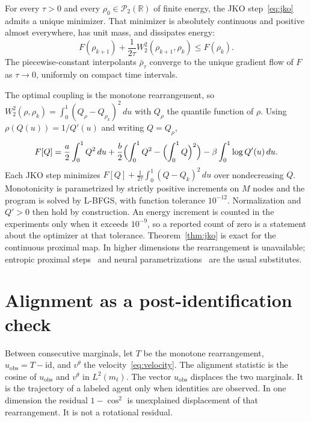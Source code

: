 \documentclass[anon,11pt]{alt2027}
\newcommand{\R}{\mathbb{R}}
\newcommand{\Ptwo}{\mathcal{P}_2}
\newcommand{\Wtwo}{W_2}
\begin{document}
\begin{theorem}
\label{thm:jko}
For every $\tau>0$ and every $\rho_0\in\Ptwo(\R)$ of finite energy, the
JKO step~\eqref{eq:jko} admits a unique minimizer. That minimizer is
absolutely continuous and positive almost everywhere, has unit mass, and
dissipates energy:
\begin{equation}
\label{eq:edp}
F(\rho_{k+1})+\frac1{2\tau}\Wtwo^2(\rho_{k+1},\rho_k)
\le
F(\rho_k).
\end{equation}
The piecewise-constant interpolants $\bar\rho_\tau$ converge to the unique
gradient flow of $F$ as $\tau\to 0$, uniformly on compact time intervals.
\end{theorem}

The optimal coupling is the monotone rearrangement, so
$\Wtwo^2(\rho,\rho_k)=\int_0^1(Q_\rho-Q_{\rho_k})^2\,du$ with $Q_\rho$ the
quantile function of $\rho$. Using $\rho(Q(u))=1/Q'(u)$ and writing $Q=Q_\rho$,
\[
F[Q]
=
\frac a2\int_0^1 Q^2\,du
+
\frac b2\Bigl(\int_0^1 Q^2-\Bigl(\int_0^1 Q\Bigr)^2\Bigr)
-
\beta\int_0^1\log Q'(u)\,du.
\]
Each JKO step minimizes $F[Q]+\frac1{2\tau}\int_0^1(Q-Q_k)^2\,du$ over
nondecreasing $Q$. Monotonicity is parametrized by strictly positive increments
on $M$ nodes and the program is solved by L-BFGS, with function tolerance
$10^{-12}$. Normalization and $Q'>0$ then hold by construction. An energy increment
is counted in the experiments only when it exceeds $10^{-9}$, so a reported
count of zero is a statement about the optimizer at that tolerance.
Theorem~\ref{thm:jko} is exact for the continuous proximal map.
In higher dimensions the rearrangement is unavailable; entropic proximal
steps~\cite{PeyreCuturi19} and neural parametrizations~\cite{JKOflow,Bunne22}
are the usual substitutes.

\section{Alignment as a post-identification check}
\label{app:alignment}

Between consecutive marginals, let $T$ be the monotone rearrangement,
$u_{\mathrm{obs}}=T-\mathrm{id}$, and $v^\theta$ the velocity~\eqref{eq:velocity}.
The alignment statistic is the cosine of $u_{\mathrm{obs}}$ and $v^\theta$ in
$L^2(m_t)$. The vector $u_{\mathrm{obs}}$ displaces the two marginals. It is
the trajectory of a labeled agent only when identities are observed. In one
dimension the residual $1-\cos^2$ is unexplained displacement of that
rearrangement. It is not a rotational residual.
\end{document}
